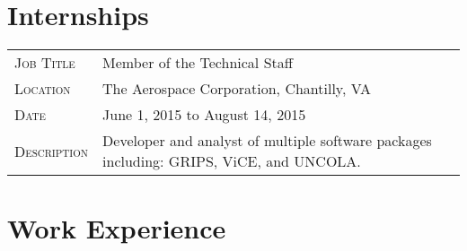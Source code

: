 \documentclass[10pt]{article}
\begin{document}
\section{Internships}
\begin{tabularx}{0.97\linewidth}{>{\raggedleft\scshape}p{3cm}X}
  Job Title    & Member of the Technical Staff\\
  Location     & The Aerospace Corporation, Chantilly, VA\\
  Date         & June 1, 2015 to August 14, 2015\\
  Description  & Developer and analyst of multiple software packages including: GRIPS, ViCE, and UNCOLA.
  \end{tabularx}

\section{Work Experience}
\end{document}
